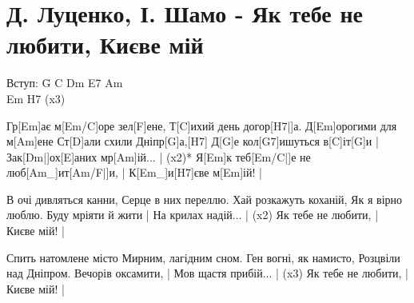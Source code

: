 \section{Д. Луценко, І. Шамо - Як тебе не любити, Києве мій}
\begin{guitar}
\begin{tabbing}
Вступ:  \= G C Dm E7 Am\\
\> Em H7 (x3)\\
\end{tabbing}
\begin{flushleft}
Гр[Em]ає м[Em/C]оре зел[F\guitarSharp]ене,
Т[C]ихий день догор[H7|]а.
Д[Em]орогими для м[Am]ене
Ст[D]али схили Дніпр[G]а,[H7]\newline
Д[G]е кол[G7]ишуться в[C]іт[G]и       |
Зак[Dm|]ох[E]аних мр[Am]ій...      | (x2)*
Я[Em]к теб[Em/C|]е не люб[Am_]ит[Am/F\guitarSharp|]и,     |
К[Em_]и[H7]єве м[Em]ій!            |

В очі дивляться канни, 
Серце в них переллю.
Хай розкажуть коханій,
Як я вірно люблю.
Буду мріяти й жити   |
На крилах надій...   | (x2)
Як тебе не любити,   |
Києве мій!           |

Спить натомлене місто
Мирним, лагідним сном.
Ген вогні, як намисто,
Розцвіли над Дніпром.
Вечорів оксамити,    |
Мов щастя прибій...  | (x3)
Як тебе не любити,   |
Києве мій!       |
\end{flushleft}
\end{guitar}